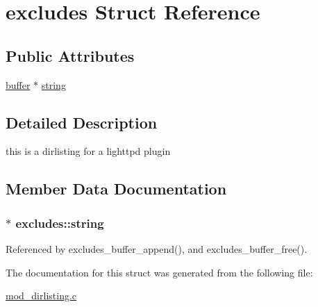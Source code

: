 \hypertarget{structexcludes}{\section{excludes Struct Reference}
\label{structexcludes}
}
\subsection*{Public Attributes}
\begin{DoxyCompactItemize}
\item 
\hyperlink{structbuffer}{buffer} $\ast$ \hyperlink{structexcludes_aad6f3586601eba5c68854a77630abee2}{string}
\end{DoxyCompactItemize}


\subsection{Detailed Description}
this is a dirlisting for a lighttpd plugin 

\subsection{Member Data Documentation}
\hypertarget{structexcludes_aad6f3586601eba5c68854a77630abee2}{
\subsubsection[{string}]{$\ast$ excludes\-::string}}\label{structexcludes_aad6f3586601eba5c68854a77630abee2}


Referenced by excludes\-\_\-buffer\-\_\-append(), and excludes\-\_\-buffer\-\_\-free().



The documentation for this struct was generated from the following file\-:\begin{DoxyCompactItemize}
\item 
\hyperlink{mod__dirlisting_8c}{mod\-\_\-dirlisting.\-c}\end{DoxyCompactItemize}
